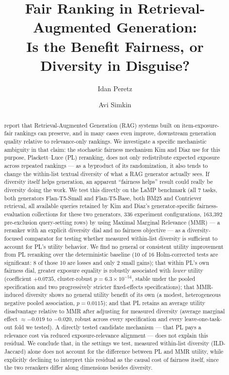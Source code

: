 \documentclass[11pt]{article}
\title{\textbf{Fair Ranking in Retrieval-Augmented Generation:\\
Is the Benefit Fairness, or Diversity in Disguise?}}
\author{Idan Peretz \and Avi Simkin}
\date{}
\begin{document}
\maketitle

\begin{abstract}
\noindent
\citet{kim2025fairrag} report that Retrieval-Augmented
Generation (RAG) systems built on item-exposure-fair rankings can preserve,
and in many cases even improve, downstream generation quality relative to
relevance-only rankings. We investigate a specific mechanistic ambiguity in
that claim: the stochastic fairness mechanism Kim and Diaz use for this
purpose, Plackett--Luce (PL) reranking, does not only redistribute expected
exposure across repeated rankings --- as a byproduct of its randomization,
it also tends to change the within-list textual diversity of what a RAG
generator actually sees. If diversity itself helps generation, an apparent
``fairness helps'' result could really be diversity doing the work. We
test this directly on the LaMP benchmark (all 7 tasks, both generators
Flan-T5-Small and Flan-T5-Base, both BM25 and Contriever retrieval, all
available queries retained by Kim and Diaz's generator-specific
fairness-evaluation collections for these two generators, 336 experiment
configurations, 163{,}392 pre-exclusion query-setting rows) by using
Maximal Marginal Relevance (MMR) --- a reranker with an explicit diversity
dial and no fairness objective --- as a diversity-focused comparator for
testing whether measured within-list diversity is sufficient to account
for PL's utility behavior. We find no general or consistent utility improvement from
PL reranking over the deterministic baseline (10 of 16 Holm-corrected
tests are significant: 8 of those 10 are losses and only 2 small gains);
that within PL's own fairness dial, greater exposure equality is robustly
associated with \emph{lower} utility (coefficient $+0.0735$,
cluster-robust $p=6.3\times10^{-54}$, stable under the pooled
specification and two progressively stricter fixed-effects
specifications); that
MMR-induced diversity shows no general utility benefit of its own (a
modest, heterogeneous negative pooled association, $p=0.0115$); and that
PL retains an average utility disadvantage relative to MMR after adjusting
for measured diversity (average marginal effect $\approx-0.019$ to
$-0.020$, robust across every specification and every leave-one-task-out
fold we tested). A directly tested candidate mechanism --- that PL pays a
relevance cost via reduced exposure-relevance alignment --- does not
explain this residual. We conclude that, in the settings we test, measured
within-list diversity (ILD-Jaccard) alone does not account for the
difference between PL and MMR utility, while explicitly declining to
interpret this residual as the causal cost of fairness itself, since the
two rerankers differ along dimensions besides diversity.
\end{abstract}
\end{document}
